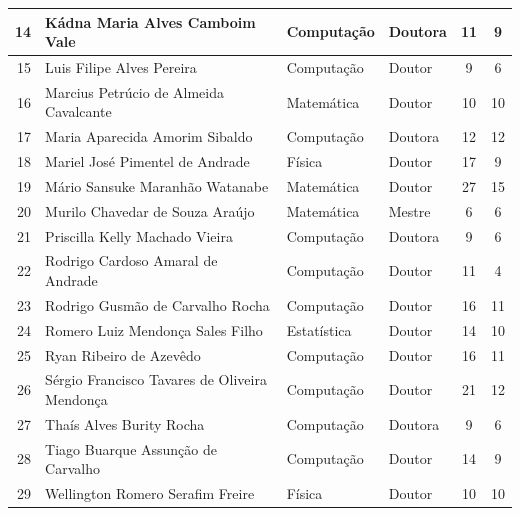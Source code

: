 \documentclass[
	12pt,				%
	openright,			%
  oneside,     %
	a4paper,			%
 hyphens,
	chapter=TITLE,		%
	english,			%
	french,				%
	spanish,			%
	brazil				%
	]{abntex2}
\begin{document}
\begin{center}
\begin{scriptsize}
\begin{longtable}{rp{6cm}p{1.8cm}p{1.4cm}p{1.9cm}p{1.8cm}}
    14 & Kádna Maria Alves Camboim Vale & Computação & Doutora & \multicolumn{1}{c}{11} & \multicolumn{1}{c}{9}\\ \midrule
    15 & Luis Filipe Alves Pereira & Computação & Doutor & \multicolumn{1}{c}{9} & \multicolumn{1}{c}{6}\\ \midrule
    16 & Marcius Petrúcio de Almeida Cavalcante & Matemática & Doutor & \multicolumn{1}{c}{10} & \multicolumn{1}{c}{10}\\ \midrule
    17 & Maria Aparecida Amorim Sibaldo & Computação & Doutora & \multicolumn{1}{c}{12} & \multicolumn{1}{c}{12}\\ \midrule
    18 & Mariel José Pimentel de Andrade & Física & Doutor & \multicolumn{1}{c}{17} & \multicolumn{1}{c}{9}\\ \midrule
    19 & Mário Sansuke Maranhão Watanabe & Matemática & Doutor & \multicolumn{1}{c}{27} & \multicolumn{1}{c}{15}\\ \midrule
    20 & Murilo Chavedar de Souza Araújo & Matemática & Mestre & \multicolumn{1}{c}{6} & \multicolumn{1}{c}{6}\\ \midrule
    21 & Priscilla Kelly Machado Vieira & Computação & Doutora & \multicolumn{1}{c}{9} & \multicolumn{1}{c}{6}\\ \midrule
    22 & Rodrigo Cardoso Amaral de Andrade & Computação & Doutor & \multicolumn{1}{c}{11} & \multicolumn{1}{c}{4}\\ \midrule
    23 & Rodrigo Gusmão de Carvalho Rocha & Computação & Doutor & \multicolumn{1}{c}{16} & \multicolumn{1}{c}{11}\\ \midrule
    24 & Romero Luiz Mendonça Sales Filho & Estatística & Doutor & \multicolumn{1}{c}{14} & \multicolumn{1}{c}{10}\\ \midrule
    25 & Ryan Ribeiro de Azevêdo & Computação & Doutor & \multicolumn{1}{c}{16} & \multicolumn{1}{c}{11}\\ \midrule
    26 & Sérgio Francisco Tavares de Oliveira Mendonça & Computação & Doutor & \multicolumn{1}{c}{21} & \multicolumn{1}{c}{12}\\ \midrule
    27 & Thaís Alves Burity Rocha & Computação & Doutora & \multicolumn{1}{c}{9} & \multicolumn{1}{c}{6}\\ \midrule
    28 & Tiago Buarque Assunção de Carvalho & Computação & Doutor & \multicolumn{1}{c}{14} & \multicolumn{1}{c}{9}\\ \midrule
    29 & Wellington Romero Serafim Freire & Física & Doutor & \multicolumn{1}{c}{10} & \multicolumn{1}{c}{10}\\ 
\bottomrule
\end{longtable}
\end{scriptsize}      
\end{center}
\end{document}
